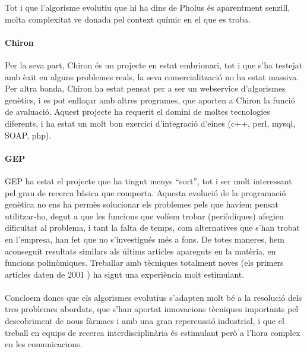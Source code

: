 Tot i que l'algorisme evolutiu que hi ha dins de Pholus és aparentment senzill,
molta complexitat ve donada pel context químic en el que es troba.

\paragraph{Chiron} %
\label{par:Chiron}

Per la seva part, Chiron és un projecte en estat embrionari, tot i que s'ha testejat amb èxit en alguns problemes reals, la seva comercialització no ha estat massiva.
Per altra banda, Chiron ha estat pensat per a ser un webservice d'algorismes genètics,
i es pot enllaçar amb altres programes, que aporten a Chiron la funció de
avaluació.  Aquest projecte ha requerit el domini de moltes tecnologies
diferents, i ha estat un molt bon exercici d'integració d'eines
(c++, perl, mysql, SOAP, php).

\paragraph{GEP} %
\label{par:GEP}
GEP ha estat el projecte que ha tingut menys ``sort'', tot i ser molt
interessant pel grau de recerca bàsica que comporta.  Aquesta evolució de la programació genètica no ens ha permès solucionar els problemes pels que havíem pensat utilitzar-ho, degut a que les funcions que volíem trobar (periòdiques) afegien
dificultat al problema, i tant la falta de temps, com alternatives que s'han
trobat en l'empresa, han fet que no s'investigués més a fons.  De totes maneres,
hem aconseguit resultats similars als últims articles apareguts en la matèria,
en funcions polinòmiques.  Treballar amb tècniques totalment noves (els primers
articles daten de 2001 \cite{ferreira:2001}) ha sigut una experiència molt
estimulant.
\\ 
\\

Concloem doncs que els algorismes evolutius s'adapten molt bé a la resolució dels tres problemes abordats, que s'han aportat innovacions tècniques importants pel descobriment de nous fàrmacs i amb una gran repercussió industrial, i que el treball en equips de recerca interdisciplinària és estimulant però a l'hora complex en les comunicacions.



